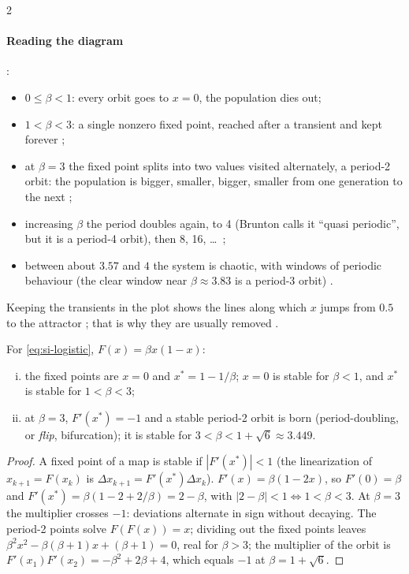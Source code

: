\begin{paracol}{2}
\paragraph{Reading the diagram} :
\begin{itemize}
  \item $0\le\beta<1$: every orbit goes to $x=0$, the population dies out;
  \item $1<\beta<3$: a single nonzero fixed point, reached after a transient and kept forever
        ;
  \item at $\beta=3$ the fixed point splits into two values visited alternately, a period-2 orbit:
        the population is bigger, smaller, bigger, smaller from one generation to the next
        ;
  \item increasing $\beta$ the period doubles again, to 4 (Brunton calls it ``quasi periodic'', but it
        is a period-4 orbit), then 8, 16, \dots\ ;
  \item between about $3.57$ and $4$ the system is chaotic, with windows of periodic behaviour (the
        clear window near $\beta\approx3.83$ is a period-3 orbit) .
\end{itemize}
Keeping the transients in the plot shows the lines along which $x$ jumps from $0.5$ to the attractor
; that is why they are usually removed .

\begin{proposition}\label{prop:si-logistic}
For \eqref{eq:si-logistic}, $F(x)=\beta x(1-x)$:
\begin{enumerate}[(i)]
  \item the fixed points are $x=0$ and $x^*=1-1/\beta$; $x=0$ is stable for $\beta<1$, and $x^*$ is
        stable for $1<\beta<3$;
  \item at $\beta=3$, $F'(x^*)=-1$ and a stable period-2 orbit is born (period-doubling, or
        \emph{flip}, bifurcation); it is stable for $3<\beta<1+\sqrt6\approx3.449$.
\end{enumerate}
\end{proposition}
\begin{proof}
A fixed point of a map is stable if $|F'(x^*)|<1$ (the linearization of $x_{k+1}=F(x_k)$ is
$\Delta x_{k+1}=F'(x^*)\Delta x_k$). $F'(x)=\beta(1-2x)$, so $F'(0)=\beta$ and
$F'(x^*)=\beta(1-2+2/\beta)=2-\beta$, with $|2-\beta|<1\iff1<\beta<3$. At $\beta=3$ the multiplier
crosses $-1$: deviations alternate in sign without decaying. The period-2 points solve $F(F(x))=x$; dividing
out the fixed points leaves $\beta^2x^2-\beta(\beta+1)x+(\beta+1)=0$, real for $\beta>3$; the multiplier of
the orbit is $F'(x_1)F'(x_2)=-\beta^2+2\beta+4$, which equals $-1$ at $\beta=1+\sqrt6$.
\end{proof}


\end{paracol}
